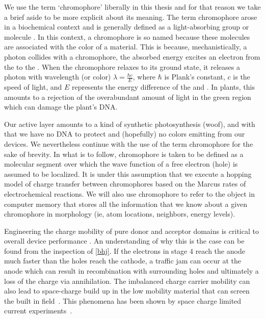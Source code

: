 We use the term `chromophore' liberally in this thesis and for that reason we take a brief aside to be more
explicit about its meaning.  
The term chromophore arose in a biochemical context and is generally defined
as a light-absorbing group or molecule \cite{biochemistry}.
In this context, a chromophore is so named because these molecules are associated with the color of a material.
This is because, mechanistically, a photon collides with a chromophore, the absorbed energy
excites an electron from the  to the
. When the chromophore relaxes to its
ground state, it releases a photon with wavelength (or color) $\lambda = \frac{\hbar c}{E}$,
where $\hbar$ is Plank's constant, $c$ is the speed of light, and $E$ represents the
energy difference of the  and . In plants, this amounts to a rejection of the overabundant amount of
light in the green region which can damage the plant's DNA. 

Our  active layer amounts to a kind of synthetic photosynthesis (woof), and with that we have no DNA to
protect and (hopefully) no colors emitting from our devices. We nevertheless continue with the use of the term chromophore
for the sake of brevity. In what is to follow, chromophore is taken to be defined as a molecular segment over which the 
wave function of a free electron (hole) is assumed to be localized.
It is under this assumption that we execute a hopping model of charge transfer between
chromophores based on the Marcus rates of electrochemical reactions. We will also use chromophore to refer to
the object in computer memory that stores all the information that we know about a given chromophore in morphology
(ie, atom locations, neighbors, energy levels).


Engineering the charge mobility of pure donor and acceptor domains is critical
to overall device performance \cite{Wang2019e}.
An understanding of why this is the case can be found from the inspection of \autoref{bhj}.
If the electrons in stage $4$ reach the anode much faster than the holes reach the cathode, a traffic jam can
occur at the anode which can result in recombination with surrounding holes and ultimately a loss of the
charge via annihilation. 
The imbalanced charge carrier mobility can also lead to space-charge build up in the 
low mobility material that can screen the built in field~\cite{Bartelt2015}.
This phenomena has been shown by space charge limited current experiments~\cite{Small2013}.

